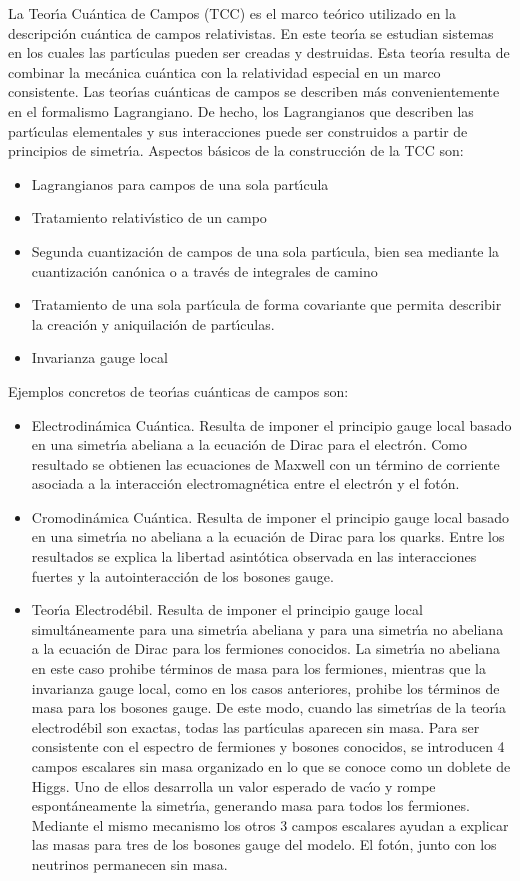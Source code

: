 La Teor\'\i a Cu\'antica de Campos (TCC) es el marco te\'orico utilizado en la descripci\'on cu\'antica de campos relativistas. En este teor\'\i a se estudian sistemas en los cuales las part\'\i culas pueden ser creadas y destruidas. Esta teor\'\i a resulta de combinar la mec\'anica cu\'antica con la relatividad especial en un marco consistente. Las teor\'\i as cu\'anticas de campos se describen m\'as convenientemente en el formalismo Lagrangiano. De hecho, los Lagrangianos que describen las part\'\i culas elementales y sus interacciones puede ser construidos a partir de principios de simetr\'\i a.  Aspectos b\'asicos de la construcci\'on de la TCC son:
\begin{itemize} %
\item Lagrangianos para campos de una sola part\'\i cula
\item Tratamiento relativ\'\i stico de un campo
\item Segunda cuantizaci\'on de campos de una sola part\'\i cula, bien sea mediante la cuantizaci\'on can\'onica o a trav\'es de integrales de camino
\item Tratamiento de una sola part\'\i cula de forma covariante que permita describir la creaci\'on y aniquilaci\'on de part\'\i culas.
\item Invarianza gauge local
\end{itemize}
Ejemplos concretos de teor\'\i as cu\'anticas de campos son:
\begin{itemize}
\item Electrodin\'amica Cu\'antica. Resulta de imponer el principio gauge local basado en una simetr\'\i a abeliana a la ecuaci\'on de Dirac para el electr\'on. Como resultado se obtienen las ecuaciones de Maxwell con un t\'ermino de corriente asociada a la interacci\'on electromagn\'etica entre el electr\'on y el fot\'on.
\item Cromodin\'amica Cu\'antica. Resulta de imponer el principio gauge local basado en una simetr\'\i a no abeliana a la ecuaci\'on de Dirac para los quarks. Entre los resultados se explica la libertad asint\'otica observada en las interacciones fuertes y la autointeracci\'on de los bosones gauge.
\item Teor\'\i a Electrod\'ebil. Resulta de imponer el principio gauge local simult\'aneamente para una simetr\'\i a abeliana y para una simetr\'\i a no abeliana a la ecuaci\'on de Dirac para los fermiones conocidos. La simetr\'\i a no abeliana en este caso prohibe t\'erminos de masa para los fermiones, mientras que la invarianza gauge local, como en los casos anteriores, prohibe los t\'erminos de masa para los bosones gauge. De este modo, cuando las simetr\'\i as de la teor\'\i a electrod\'ebil son exactas, todas las part\'\i culas aparecen sin masa. Para ser consistente con el espectro de fermiones y bosones conocidos, se introducen 4 campos escalares sin masa organizado en lo que se conoce como un doblete de Higgs. Uno de ellos desarrolla un valor esperado de vac\'\i o y rompe espont\'aneamente la simetr\'\i a, generando masa para todos los fermiones. Mediante el mismo mecanismo los otros 3 campos escalares ayudan a explicar las masas para tres de los bosones gauge del modelo. El fot\'on, junto con los neutrinos permanecen sin masa. 
\end{itemize} %
